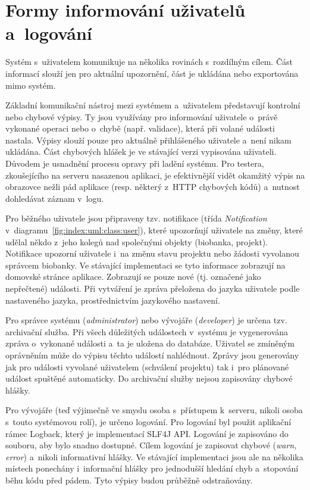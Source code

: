 \documentclass[11pt, draft, oneside]{fithesis2}
\begin{document}
\section{Formy informování uživatelů a~logování}
Systém s~uživatelem komunikuje na několika rovinách s~rozdílným cílem. Část informací slouží jen pro aktuální upozornění, část je ukládána nebo exportována mimo systém.

Základní komunikační nástroj mezi systémem a~uživatelem představují kontrolní nebo chybové výpisy. Ty jsou využívány pro informování uživatele o~právě vykonané operaci nebo o~chybě (např. validace), která při volané události nastala. Výpisy slouží pouze pro aktuálně přihlášeného uživatele a~není nikam ukládána. Část chybových hlášek je ve stávající verzi vypisována uživateli. Důvodem je usnadnění procesu opravy při ladění systému. Pro testera, zkoušejícího na serveru nasazenou aplikaci, je efektivnější vidět okamžitý výpis na obrazovce nežli pád aplikace (resp. některý z~HTTP chybových kódů) a~nutnost dohledávat záznam v~logu.

Pro běžného uživatele jsou připraveny tzv. notifikace (třída \textit{Notification} v~diagramu~\ref{fig:index:uml:class:user}), které upozorňují uživatele na změny, které udělal někdo z~jeho kolegů nad společnými objekty (biobanka, projekt). Notifikace upozorní uživatele i~na změnu stavu projektu nebo žádosti vyvolanou správcem biobanky. Ve stávající implementaci se tyto informace zobrazují na domovské stránce aplikace. Zobrazují se pouze nové (tj. označené jako nepřečtené) události. Při vytváření je zpráva přeložena do jazyka uživatele podle nastaveného jazyka, prostřednictvím jazykového nastavení.

Pro správce systému (\textit{administrator}) nebo vývojáře (\textit{developer}) je určena tzv. archivační služba. Při všech důležitých událostech v~systému je vygenerována zpráva o~vykonané události a~ta je uložena do databáze. Uživatel se zmíněným oprávněním může do výpisu těchto událostí nahlédnout. Zprávy jsou generovány jak pro události vyvolané uživatelem (schválení projektu) tak i~pro plánované událost spuštěné automaticky. Do archivační služby nejsou zapisovány chybové hlášky.

Pro vývojáře (teď výjimečně ve smyslu osoba s~přístupem k~serveru, nikoli osoba s~touto systémovou rolí), je určeno logování. Pro logování byl použit aplikační rámec Logback, který je implementací SLF4J API. Logování je zapisováno do souboru, aby bylo snadno dostupné. Cílem logování je zapisovat chybové (\textit{warn, error}) a~nikoli informativní hlášky. Ve stávající implementaci jsou ale na několika místech ponechány i~informační hlášky pro jednodušší hledání chyb a~stopování běhu kódu před pádem. Tyto výpisy budou průběžně odstraňovány.
\end{document}
